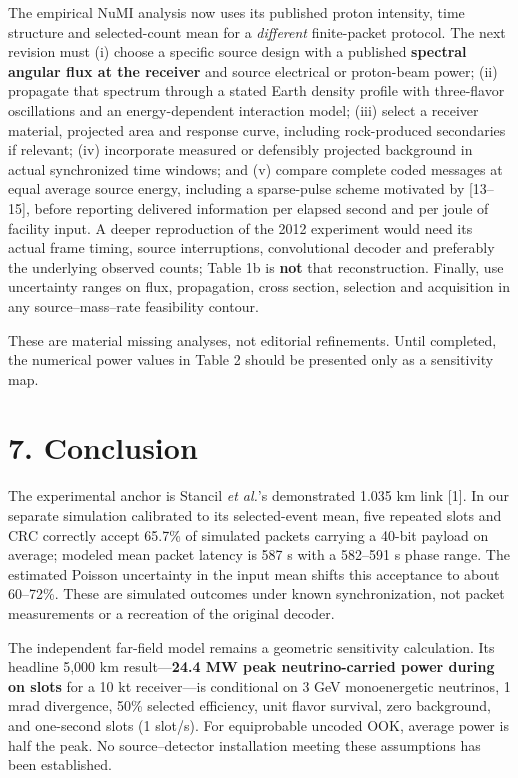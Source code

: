 \documentclass[
]{article}
\begin{document}
The empirical NuMI analysis now uses its published proton intensity,
time structure and selected-count mean for a \emph{different}
finite-packet protocol. The next revision must (i) choose a specific
source design with a published \textbf{spectral angular flux at the
receiver} and source electrical or proton-beam power; (ii) propagate
that spectrum through a stated Earth density profile with three-flavor
oscillations and an energy-dependent interaction model; (iii) select a
receiver material, projected area and response curve, including
rock-produced secondaries if relevant; (iv) incorporate measured or
defensibly projected background in actual synchronized time windows; and
(v) compare complete coded messages at equal average source energy,
including a sparse-pulse scheme motivated by {[}13--15{]}, before
reporting delivered information per elapsed second and per joule of
facility input. A deeper reproduction of the 2012 experiment would need
its actual frame timing, source interruptions, convolutional decoder and
preferably the underlying observed counts; Table 1b is \textbf{not} that
reconstruction. Finally, use uncertainty ranges on flux, propagation,
cross section, selection and acquisition in any source--mass--rate
feasibility contour.

These are material missing analyses, not editorial refinements. Until
completed, the numerical power values in Table 2 should be presented
only as a sensitivity map.

\hypertarget{conclusion}{%
\section{7. Conclusion}\label{conclusion}}

The experimental anchor is Stancil \emph{et al.}'s demonstrated 1.035 km
link {[}1{]}. In our separate simulation calibrated to its
selected-event mean, five repeated slots and CRC correctly accept 65.7\%
of simulated packets carrying a 40-bit payload on average; modeled mean
packet latency is 587 s with a 582--591 s phase range. The estimated
Poisson uncertainty in the input mean shifts this acceptance to about
60--72\%. These are simulated outcomes under known synchronization, not
packet measurements or a recreation of the original decoder.

The independent far-field model remains a geometric sensitivity
calculation. Its headline 5,000 km result---\textbf{24.4 MW peak
neutrino-carried power during on slots} for a 10 kt receiver---is
conditional on 3 GeV monoenergetic neutrinos, 1 mrad divergence, 50\%
selected efficiency, unit flavor survival, zero background, and
one-second slots (1 slot/s). For equiprobable uncoded OOK, average power
is half the peak. No source--detector installation meeting these
assumptions has been established.
\end{document}
